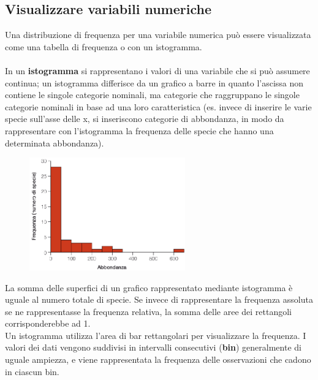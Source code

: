\documentclass[10pt, draft]{book}
\begin{document}
\subsection{Visualizzare variabili numeriche}
Una distribuzione di frequenza per una variabile numerica può essere visualizzata come una tabella di frequenza o con un istogramma.
\\
\\
In un \textbf{istogramma} si rappresentano i valori di una variabile che si può assumere continua; un istogramma differisce da un grafico a barre in quanto l’ascissa non contiene le singole categorie nominali, ma categorie che raggruppano le singole categorie nominali in base ad una loro caratteristica (es. invece di inserire le varie specie sull’asse delle x, si inseriscono categorie di abbondanza, in modo da rappresentare con l’istogramma la frequenza delle specie che hanno una determinata abbondanza). 
    \begin{figure}[h]\label{fig2.1-2}
    \centering
    \includegraphics[width=0.6\textwidth]{fig2.1-2}
    \caption{\small{}}
    \end{figure}
La somma delle superfici di un grafico rappresentato mediante istogramma è uguale al numero totale di specie. Se invece di rappresentare la frequenza assoluta se ne rappresentasse la frequenza relativa, la somma delle aree dei rettangoli corrisponderebbe ad 1.
\\
Un istogramma utilizza l'area di bar rettangolari per visualizzare la frequenza. I valori dei dati vengono suddivisi in intervalli consecutivi (\textbf{bin}) generalmente di uguale ampiezza, e viene rappresentata la frequenza delle osservazioni che cadono in ciascun bin. 
\\
\end{document}
